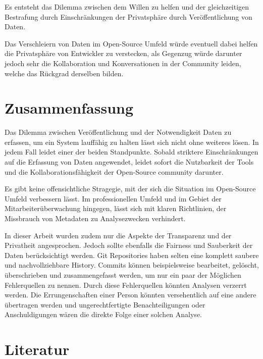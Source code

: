 \documentclass[12pt,a4paper]{article}
\begin{document}
Es entsteht das Dilemma zwischen dem Willen zu helfen und der gleichzeitigen Bestrafung durch Einschränkungen der Privatsphäre durch Veröffentlichung von Daten.

Das Verschleiern von Daten im Open-Source Umfeld würde eventuell dabei helfen die Privatsphäre von Entwickler zu verstecken, als Gegenzug würde darunter jedoch sehr die Kollaboration und Konversationen in der Community leiden, welche das Rückgrad derselben bilden.

\section{Zusammenfassung}
Das Dilemma zwischen Veröffentlichung und der Notwendigkeit Daten zu erfassen, um ein System lauffähig zu halten lässt sich nicht ohne weiteres lösen.
In jedem Fall leidet einer der beiden Standpunkte.
Sobald striktere Einschränkungen auf die Erfassung von Daten angewendet, leidet sofort die Nutzbarkeit der Tools und die Kollaborationsfähigkeit der Open-Source community darunter.

Es gibt keine offensichtliche Stragegie, mit der sich die Situation im Open-Source Umfeld verbessern lässt.
Im professionellen Umfeld und im Gebiet der Mitarbeiterüberwachung hingegen, lässt sich mit klaren Richtlinien, der Missbrauch von Metadaten zu Analysezwecken verhindert.



In dieser Arbeit wurden zudem nur die Aspekte der Transparenz und der Privatheit angesprochen.
Jedoch sollte ebenfalls die Fairness und Sauberkeit der Daten berücksichtigt werden.
Git Repositories haben selten eine komplett saubere und nachvollziehbare History.
Commits können beispielsweise bearbeitet, gelöscht, überschrieben und zusammengefasst werden, um nur ein paar der Möglichen Fehlerquellen zu nennen.
Durch diese Fehlerquellen könnten Analysen verzerrt werden.
Die Errungenschaften einer Person könnten versehentlich auf eine andere übertragen werden und ungerechtfertigte Benachteiligungen oder Anschuldigungen wären die direkte Folge einer solchen Analyse.

\section{Literatur}

\printbibliography
\end{document}

